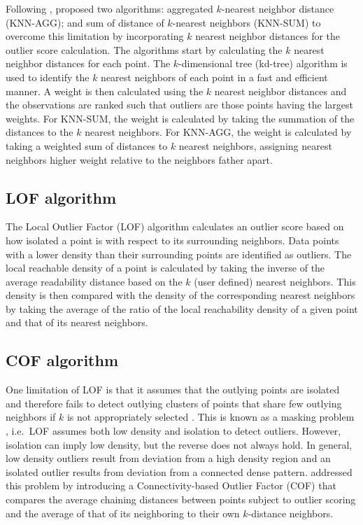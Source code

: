 \documentclass{agujournal2018}
\begin{document}
Following \citet{angiulli2002fast}, \citet{madsen2018ddoutlier}
proposed two algorithms: aggregated \(k\)-nearest neighbor distance
(KNN-AGG); and sum of distance of \(k\)-nearest neighbors (KNN-SUM) to
overcome this limitation by incorporating \(k\) nearest neighbor
distances for the outlier score calculation. The algorithms start by
calculating the \(k\) nearest neighbor distances for each point. The
\(k\)-dimensional tree (kd-tree) algorithm
\citep{bentley1975multidimensional} is used to identify the \(k\)
nearest neighbors of each point in a fast and efficient manner. A weight
is then calculated using the \(k\) nearest neighbor distances and the
observations are ranked such that outliers are those points having the
largest weights. For KNN-SUM, the weight is calculated by taking the
summation of the distances to the \(k\) nearest neighbors. For KNN-AGG,
the weight is calculated by taking a weighted sum of distances to \(k\)
nearest neighbors, assigning nearest neighbors higher weight relative to
the neighbors father apart.

\subsection*{LOF algorithm}\label{lof-algorithm}
The Local Outlier Factor (LOF) algorithm \citep{breunig2000lof}
calculates an outlier score based on how isolated a point is with
respect to its surrounding neighbors. Data points with a lower density
than their surrounding points are identified as outliers. The local
reachable density of a point is calculated by taking the inverse of the
average readability distance based on the \(k\) (user defined) nearest
neighbors. This density is then compared with the density of the
corresponding nearest neighbors by taking the average of the ratio of
the local reachability density of a given point and that of its nearest
neighbors.

\subsection*{COF algorithm}\label{cof-algorithm}
One limitation of LOF is that it assumes that the outlying points are
isolated and therefore fails to detect outlying clusters of points that
share few outlying neighbors if \(k\) is not appropriately selected
\citep{tang2002enhancing}. This is known as a masking problem
\citep{hadi1992identifying}, i.e.~LOF assumes both low density and
isolation to detect outliers. However, isolation can imply low density,
but the reverse does not always hold. In general, low density outliers
result from deviation from a high density region and an isolated outlier
results from deviation from a connected dense pattern.
\citet{tang2002enhancing} addressed this problem by introducing a
Connectivity-based Outlier Factor (COF) that compares the average
chaining distances between points subject to outlier scoring and the
average of that of its neighboring to their own \(k\)-distance
neighbors.
\end{document}
